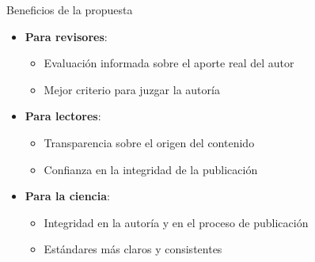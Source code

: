 \begin{frame}{Beneficios de la propuesta}
    \begin{itemize}
        \item \textbf{Para revisores}:
              \begin{itemize}
                  \item Evaluación informada sobre el aporte real del autor
                  \item Mejor criterio para juzgar la autoría
              \end{itemize}
              \vspace{0.3cm}
        \item \textbf{Para lectores}:
              \begin{itemize}
                  \item Transparencia sobre el origen del contenido
                  \item Confianza en la integridad de la publicación
              \end{itemize}
              \vspace{0.3cm}
        \item \textbf{Para la ciencia}:
              \begin{itemize}
                  \item Integridad en la autoría y en el proceso de publicación
                  \item Estándares más claros y consistentes
              \end{itemize}
    \end{itemize}
\end{frame}
